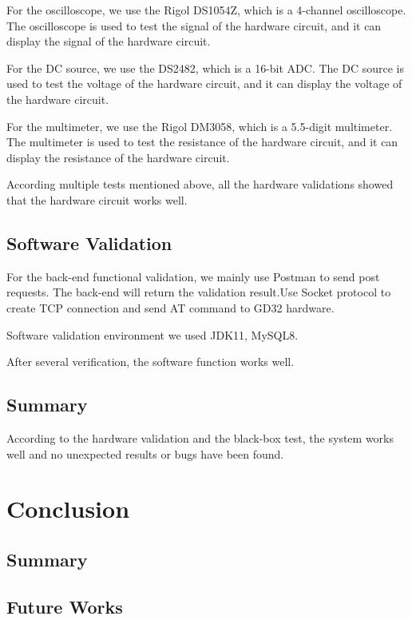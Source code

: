 \documentclass[11pt, a4paper]{article}
\begin{document}
For the oscilloscope, we use the Rigol DS1054Z, which is a 4-channel oscilloscope.
The oscilloscope is used to test the signal of the hardware circuit, and it can display the signal of the hardware circuit.

For the DC source, we use the DS2482, which is a 16-bit ADC.
The DC source is used to test the voltage of the hardware circuit, and it can display the voltage of the hardware circuit.

For the multimeter, we use the Rigol DM3058, which is a 5.5-digit multimeter.
The multimeter is used to test the resistance of the hardware circuit, and it can display the resistance of the hardware circuit.

According multiple tests mentioned above, all the hardware validations showed that the hardware circuit works well.
\subsection{Software Validation}
For the back-end functional validation, we mainly use Postman to send post requests. The back-end will return the validation result.Use Socket protocol to create TCP connection and send AT command to GD32 hardware.

Software validation environment we used JDK11, MySQL8.

After several verification, the software function works well.
\subsection{Summary}
According to the hardware validation and the black-box test, the system works well and no unexpected results or bugs have been found.

\section{Conclusion}
\subsection{Summary}
\subsection{Future Works}


\nocite{*}
\printbibliography
\end{document}
